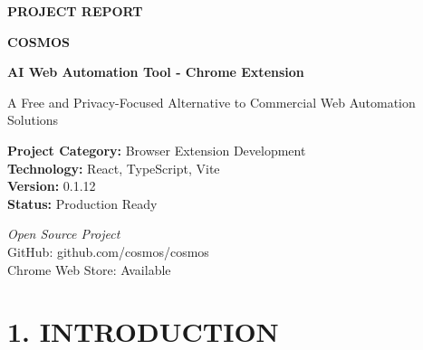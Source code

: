 \documentclass[12pt,a4paper]{article}
\begin{document}
\begin{titlepage}
    \centering
    \vspace*{1.5cm}
    
    {\fontsize{16}{20}\selectfont\textbf{PROJECT REPORT}}
    
    \vspace{1cm}
    
    {\fontsize{14}{18}\selectfont\textbf{COSMOS}}
    
    \vspace{0.5cm}
    
    {\fontsize{12}{14}\selectfont\textbf{AI Web Automation Tool - Chrome Extension}}
    
    \vspace{2cm}
    
    {\fontsize{12}{14}\selectfont
    A Free and Privacy-Focused Alternative to Commercial Web Automation Solutions
    }
    
    \vspace{2.5cm}
    
    {\fontsize{12}{14}\selectfont
    \textbf{Project Category:} Browser Extension Development \\
    \vspace{0.3cm}
    \textbf{Technology:} React, TypeScript, Vite \\
    \vspace{0.3cm}
    \textbf{Version:} 0.1.12 \\
    \vspace{0.3cm}
    \textbf{Status:} Production Ready
    }
    
    \vfill
    
    {\fontsize{12}{14}\selectfont
    \textit{Open Source Project} \\
    \vspace{0.2cm}
    GitHub: github.com/cosmos/cosmos \\
    \vspace{0.2cm}
    Chrome Web Store: Available
    }
    
    \vspace{1cm}
    
\end{titlepage}

\newpage
\tableofcontents
\newpage

\section*{\textbf{1. INTRODUCTION}}
\end{document}

